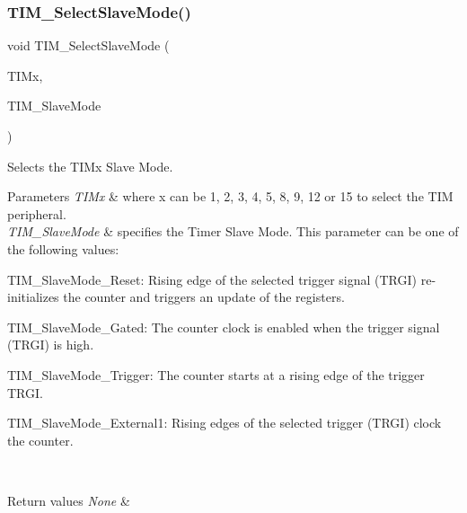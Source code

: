 \subsubsection{\texorpdfstring{TIM\_SelectSlaveMode()}{TIM\_SelectSlaveMode()}}
{\footnotesize\ttfamily void T\+I\+M\+\_\+\+Select\+Slave\+Mode (\begin{DoxyParamCaption}\item[{\mbox{\hyperlink{struct_t_i_m___type_def}{T\+I\+M\+\_\+\+Type\+Def}} $\ast$}]{T\+I\+Mx,  }\item[{uint16\+\_\+t}]{T\+I\+M\+\_\+\+Slave\+Mode }\end{DoxyParamCaption})}



Selects the T\+I\+Mx Slave Mode. 


\begin{DoxyParams}{Parameters}
{\em T\+I\+Mx} & where x can be 1, 2, 3, 4, 5, 8, 9, 12 or 15 to select the T\+IM peripheral. \\
\hline
{\em T\+I\+M\+\_\+\+Slave\+Mode} & specifies the Timer Slave Mode. This parameter can be one of the following values\+: \begin{DoxyItemize}
\item T\+I\+M\+\_\+\+Slave\+Mode\+\_\+\+Reset\+: Rising edge of the selected trigger signal (T\+R\+GI) re-\/initializes the counter and triggers an update of the registers. \item T\+I\+M\+\_\+\+Slave\+Mode\+\_\+\+Gated\+: The counter clock is enabled when the trigger signal (T\+R\+GI) is high. \item T\+I\+M\+\_\+\+Slave\+Mode\+\_\+\+Trigger\+: The counter starts at a rising edge of the trigger T\+R\+GI. \item T\+I\+M\+\_\+\+Slave\+Mode\+\_\+\+External1\+: Rising edges of the selected trigger (T\+R\+GI) clock the counter. \end{DoxyItemize}
\\
\hline
\end{DoxyParams}

\begin{DoxyRetVals}{Return values}
{\em None} & \\
\hline
\end{DoxyRetVals}
\mbox{\label{group___t_i_m___exported___functions_ga7880e4c00002d6421f9059a2ed841d5c}} 
